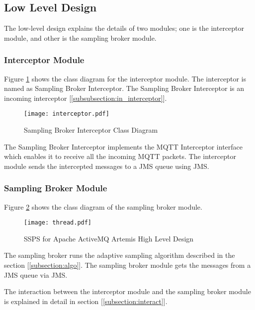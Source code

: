 \subsection{Low Level Design}

The low-level design explains the details of two modules; one is the interceptor module, and other is the sampling broker module.

\subsubsection{Interceptor Module}

Figure \ref{figures:artemis_interceptor} shows the class diagram for the interceptor module. The interceptor is named as Sampling Broker Interceptor. The Sampling Broker Interceptor is an incoming interceptor [\ref{subsubsection:in_interceptor}].

\makeatletter
\setlength{\intextsep}{20pt}
\makeatother

\begin{figure}[h!]
\centering
\texttt{[image: interceptor.pdf]}
\caption{Sampling Broker Interceptor Class Diagram}\label{figures:artemis_interceptor}
\end{figure}

The Sampling Broker Interceptor implements the MQTT Interceptor interface which enables it to receive all the incoming MQTT packets. The interceptor module sends the intercepted messages to a JMS queue using JMS.

\subsubsection{Sampling Broker Module}

Figure \ref{figures:artemis_thread} shows the class diagram of the sampling broker module.

\makeatletter
\setlength{\intextsep}{20pt}
\makeatother

\begin{figure}[h!]
\centering
\texttt{[image: thread.pdf]}
\caption{SSPS for Apache ActiveMQ Artemis High Level Design}\label{figures:artemis_thread}
\end{figure}

The sampling broker runs the adaptive sampling algorithm described in the section [\ref{subsection:algo}]. The sampling broker module gets the messages from a JMS queue via JMS.

The interaction between the interceptor module and the sampling broker module is explained in detail in section [\ref{subsection:interact}].